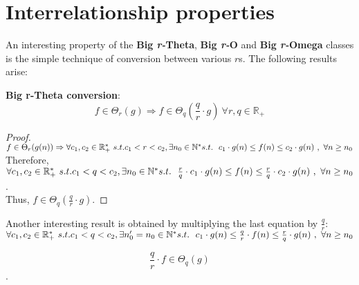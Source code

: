  
\section{Interrelationship properties}
An interesting property of the \textbf{Big \textit{r-}Theta},  \textbf{Big \textit{r-}O} and \textbf{Big \textit{r-}Omega} classes is the simple technique of conversion between various $r$s. The following results arise:

\begin{theorem} \item \textbf{Big r-Theta conversion}: 
 \[  f \in \Theta_{r}(g) \Rightarrow f \in \Theta_{q} \left( \frac{q}{r} \cdot g \right) \ \forall r,q \in \mathbb{R}_{+}\]
\end{theorem} 

\begin{proof} 
$ f \in \Theta_{r}(g(n)) \Rightarrow \forall c_{1}, c_{2} \in \mathbb{R}^{*}_{+} \ s.t.  c_{1}< r < c_{2} , \exists n_{0} \in \mathbb{N}^{*}\ \\ s.t.\ \ c_{1} \cdot g(n) \leq f(n) \leq c_{2} \cdot g(n)\ ,\  \forall n \geq n_{0} $ \\
Therefore, $\forall c_{1}, c_{2} \in \mathbb{R}^{*}_{+} \ s.t.  c_{1} < q < c_{2} , \exists n_{0} \in \mathbb{N}^{*}\ \\ s.t.\ \ \frac{r}{q} \cdot c_{1} \cdot g(n) \leq f(n) \leq \frac{r}{q} \cdot c_{2} \cdot g(n)\ ,\  \forall n \geq n_{0}$. \\
Thus, $f \in \Theta_{q} \left( \frac{q}{r} \cdot g \right)$.
\end{proof} 

Another interesting result is obtained by multiplying the last equation by $\frac{q}{r}$: \\
$\forall c_{1}, c_{2} \in \mathbb{R}^{*}_{+} \ s.t.  c_{1} < q < c_{2} , \exists n_{0}' = n_{0} \in \mathbb{N}^{*}\ \\ s.t.\ \ c_{1} \cdot g(n) \leq \frac{q}{r} \cdot f(n) \leq \frac{r}{q} \cdot g(n)\ ,\  \forall n \geq n_{0}$ 
\begin{corollary} 
\[ \frac{q}{r} \cdot f \in \Theta_{q} \left( g \right)\].
\end{corollary} 




